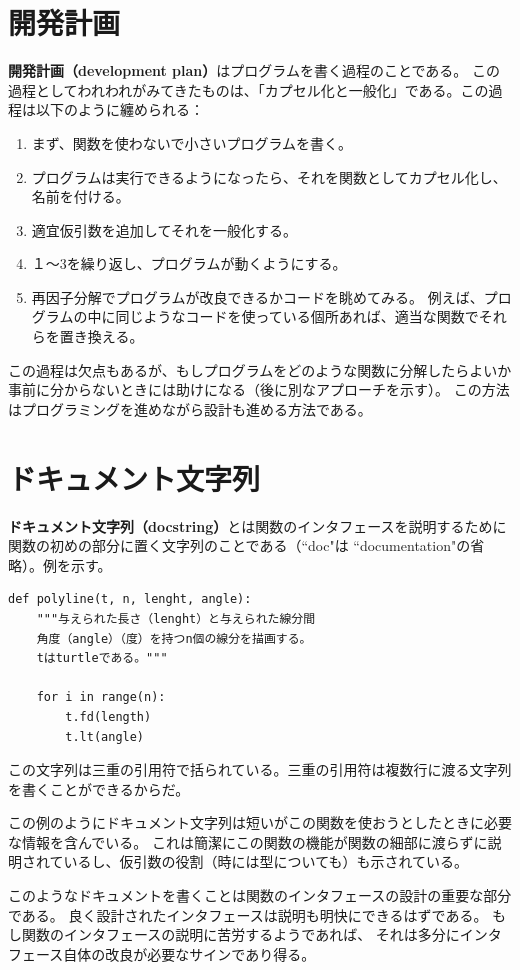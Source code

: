 \documentclass[a4j,12pt,makeidx]{jbook}
\begin{document}
\section{開発計画}
{\bf 開発計画（development plan）}はプログラムを書く過程のことである。
この過程としてわれわれがみてきたものは、「カプセル化と一般化」である。この過程は以下のように纏められる：
\begin{enumerate}
\item まず、関数を使わないで小さいプログラムを書く。
\item プログラムは実行できるようになったら、それを関数としてカプセル化し、名前を付ける。
\item 適宜仮引数を追加してそれを一般化する。
\item １～3を繰り返し、プログラムが動くようにする。
\item 再因子分解でプログラムが改良できるかコードを眺めてみる。
例えば、プログラムの中に同じようなコードを使っている個所あれば、適当な関数でそれらを置き換える。
\end{enumerate}
この過程は欠点もあるが、もしプログラムをどのような関数に分解したらよいか事前に分からないときには助けになる（後に別なアプローチを示す）。
この方法はプログラミングを進めながら設計も進める方法である。
%
\section{ドキュメント文字列}
{\bf ドキュメント文字列（docstring）}とは関数のインタフェースを説明するために関数の初めの部分に置く文字列のことである（``doc"は
``documentation"の省略）。例を示す。
\begin{verbatim}
def polyline(t, n, lenght, angle):
    """与えられた長さ（lenght）と与えられた線分間
    角度（angle）（度）を持つn個の線分を描画する。
    tはturtleである。"""
    
    for i in range(n):
        t.fd(length)
        t.lt(angle)
\end{verbatim}
この文字列は三重の引用符で括られている。三重の引用符は複数行に渡る文字列を書くことができるからだ。\par
この例のようにドキュメント文字列は短いがこの関数を使おうとしたときに必要な情報を含んでいる。
これは簡潔にこの関数の機能が関数の細部に渡らずに説明されているし、仮引数の役割（時には型についても）も示されている。\par
このようなドキュメントを書くことは関数のインタフェースの設計の重要な部分である。
良く設計されたインタフェースは説明も明快にできるはずである。
もし関数のインタフェースの説明に苦労するようであれば、
それは多分にインタフェース自体の改良が必要なサインであり得る。
%
\end{document}

